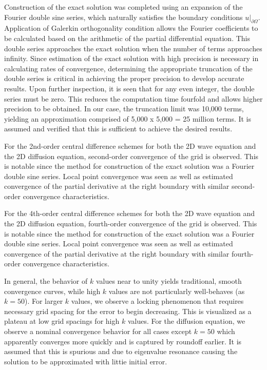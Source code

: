 \documentclass[10pt]{article}		%
\numberwithin{equation}{section}
\begin{document}
Construction of the exact solution was completed using an expansion of the Fourier double sine series, which naturally satisfies the boundary conditions $u\big|_{\partial \Omega}$. Application of Galerkin orthogonality condition allows the Fourier coefficients to be calculated based on the arithmetic of the partial differential equation. This double series approaches the exact solution when the number of terms approaches infinity. Since estimation of the exact solution with high precision is necessary in calculating rates of convergence, determining the appropriate truncation of the double series is critical in achieving the proper precision to develop accurate results. Upon further inspection, it is seen that for any even integer, the double series must be zero. This reduces the computation time fourfold and allows higher precision to be obtained. In our case, the truncation limit was 10,000 terms, yielding an approximation comprised of 5,000 x 5,000 = 25 million terms. It is assumed and verified that this is sufficient to achieve the desired results.

For the 2nd-order central difference schemes for both the 2D wave equation and the 2D diffusion equation, second-order convergence of the grid is observed. This is notable since the method for construction of the exact solution was a Fourier double sine series. Local point convergence was seen as well as estimated convergence of the partial derivative at the right boundary with similar second-order convergence characteristics.

For the 4th-order central difference schemes for both the 2D wave equation and the 2D diffusion equation, fourth-order convergence of the grid is observed. This is notable since the method for construction of the exact solution was a Fourier double sine series. Local point convergence was seen as well as estimated convergence of the partial derivative at the right boundary with similar fourth-order convergence characteristics.

In general, the behavior of $k$ values near to unity yields traditional, smooth convergence curves, while high $k$ values are not particularly well-behaves (as $k=50$). For larger $k$ values, we observe a locking phenomenon that requires necessary grid spacing for the error to begin decreasing. This is visualized as a plateau at low grid spacings for high $k$ values. For the diffusion equation, we observe a nominal convergence behavior for all cases except $k = 50$ which apparently converges more quickly and is captured by roundoff earlier. It is assumed that this is spurious and due to eigenvalue resonance causing the solution to be approximated with littie initial error.
\end{document}
